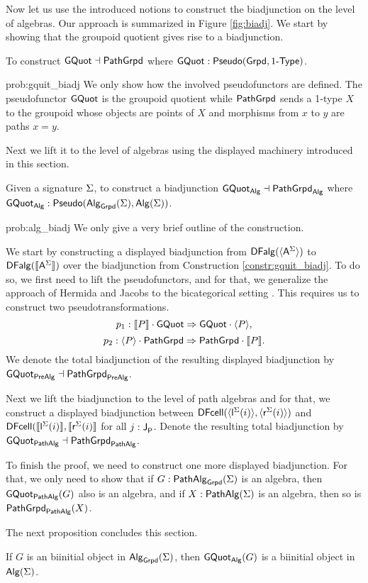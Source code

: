 Now let us use the introduced notions to construct the biadjunction on the level of algebras.
Our approach is summarized in Figure \ref{fig:biadj}.
We start by showing that the groupoid quotient gives rise to a biadjunction.

\begin{problem}
\label{prob:gquit_biadj}
To construct $\gquot \dashv \pgrpd$ where $\gquot : \pseudo(\grpd, \onetypes)$.
\end{problem}

\begin{construction}{prob:gquit_biadj}
\label{constr:gquit_biadj}
We only show how the involved pseudofunctors are defined.
The pseudofunctor $\gquot$ is the groupoid quotient
while $\pgrpd$ sends a 1-type $X$ to the groupoid whose objects are points of $X$ and morphisms from $x$ to $y$ are paths $x = y$.
\end{construction}

Next we lift it to the level of algebras using the displayed machinery introduced in this section.

\begin{problem}
\label{prob:alg_biadj}
Given a signature $\sign$, to construct a biadjunction $\alggquot \dashv \algpgrpd$ where $\alggquot : \pseudo(\algG{\sign}, \algebra{\sign})$.
\end{problem}

\begin{construction}{prob:alg_biadj}
\label{constr:alg_biadj}
We only give a very brief outline of the construction.

We start by constructing a displayed biadjunction
from $\DFAlg(\semPG{\pointconstr[\sign]})$
to $\DFAlg(\semP{\pointconstr[\sign]})$
over the biadjunction from
Construction \ref{constr:gquit_biadj}.
To do so, we first need to lift the pseudofunctors, and for that, we generalize the approach of Hermida and Jacobs
to the bicategorical setting \cite[Theorem 2.14]{hermida1998structural}.
This requires us to construct two pseudotransformations.
\[
p_1 : \pstrans{\semP{P} \cdot \gquot}{\gquot \cdot \semPG{P}},
\]
\[
p_2 : \pstrans{\semPG{P} \cdot \pgrpd}{\pgrpd \cdot \semP{P}}.
\]
We denote the total biadjunction of the resulting displayed biadjunction by $\pregquot \dashv \prepgrpd$.

Next we lift the biadjunction to the level of path algebras
and for that, we construct a displayed biadjunction between 
$\DCell(\semEG{\pathleft[\sign](i)},\semEG{\pathright[\sign](i)})$
and $\DCell(\semE{\pathleft[\sign](i)},\semE{\pathright[\sign](i)}$
for all $j : \pathlabel$.
Denote the resulting total biadjunction by $\pathgquot \dashv \pathpgrpd$.

To finish the proof, we need to construct one more displayed biadjunction.
For that, we only need to show that if $G : \pathalgG{\sign}$ is an algebra, then $\pathgquot(G)$ also is an algebra,
and if $X : \pathalg{\sign}$ is an algebra, then so is $\pathpgrpd(X)$.
\end{construction}

The next proposition concludes this section.

\begin{proposition}
\label{prop:biinitial_in_grpd}
If $G$ is an biinitial object in $\algG{\sign}$,
then $\alggquot(G)$ is a biinitial object in $\algebra{\sign}$.
\end{proposition}